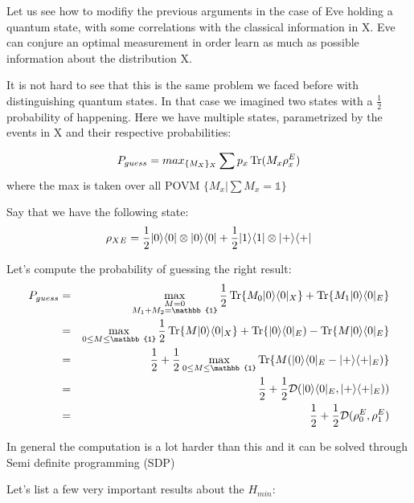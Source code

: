 Let us see how to modifiy the previous arguments in the case of Eve holding a quantum state, with some correlations with the classical information in X. Eve can conjure an optimal measurement in order learn as much as possible information about the distribution X.

It is not hard to see that this is the same problem we faced before with distinguishing quantum states. In that case we imagined two states with a $\frac{1}{2}$ probability of happening. Here we have multiple states, parametrized by the events in X and their respective probabilities:

\begin{equation}
	P_{guess} = max_{\{ M_X\}_X} \sum p_x \operatorname{Tr} (M_x \rho_x^E)
\end{equation}
where the max is taken over all POVM $\{M_x |  \sum M_x = \mathbb{1}\}$


\begin{example}
	Say that we have the following state:
	\begin{equation}
		\rho_{XE} = \frac{1}{2} \lvert0\rangle \langle0\rvert \otimes \lvert0\rangle\langle0\rvert + \frac{1}{2} \lvert1\rangle \langle1\rvert \otimes \lvert+\rangle\langle+\rvert
	\end{equation}

	Let's compute the probability of guessing the right result:
	\begin{eqnarray}
		P_{guess} &=&
		\max_{\substack{M = 0\\ M_1 + M_2 = \mathbb{1}}} \frac{1}{2} \Tr  \{M_0 \density{0}{0}_X\}  + \Tr\{M_1 \ket{0}\bra{0}_E\} \nonumber \\
		&=&
		\max_{\substack{0 \le M \le \mathbb{1}}} \frac{1}{2} \Tr \{M\density{0}{0}_X\} + \Tr\{\ket{0}\bra{0}_E) - \Tr\{M\ket{0}\bra{0}_E\} \nonumber \\
		&=&
		\frac{1}{2} + \frac{1}{2} \max_{\substack{0 \le M \le \mathbb{1}}} \Tr\{M(\ket{0}\bra{0}_E - \ket{+}\bra{+}_E)\} \nonumber \\
		&=& \frac{1}{2} + \frac{1}{2} \mathcal{D}(\ket{0}\bra{0}_E, \ket{+}\bra{+}_E)) \nonumber \\
		&=& \frac{1}{2} + \frac{1}{2} \mathcal{D}(\rho_0^E, \rho_1^E)
	\end{eqnarray}
\end{example}

In general the computation is a lot harder than this and it can be solved through Semi definite programming (SDP)

Let's list a few very important results about the $H_{min}$:

